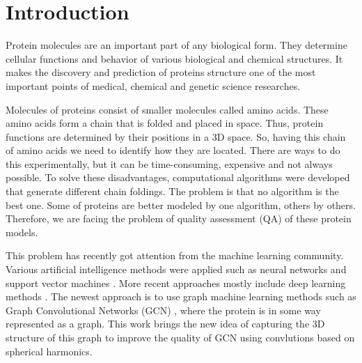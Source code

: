 \documentclass[12pt,twoside]{article}
\title
{Quality prediction of proteins models with spherical convolutions on three-dimensional graphs}
\author
{Nikita Pavlichenko, Sergei Grudinin, Ilia Igashov.} %
\begin{document}
	
	\maketitle
	
	\section{Introduction}
	Protein molecules are an important part of any biological form. They determine cellular 
	functions and behavior of various biological and chemical structures. It makes the discovery 
	and prediction of proteins structure one of the most important points of medical, chemical 
	and genetic science researches.

	Molecules of proteins consist of smaller molecules called amino acids. These amino acids
	form a chain that is folded and placed in space. Thus, protein functions are determined
	by their positions in a 3D space. So, having this chain of amino acids we need to identify
	how they are located. There are ways to do this experimentally, but it can be time-consuming,
	expensive and not always possible. To solve these disadvantages, computational algorithms \cite{Arnold2005}\cite{Lundstroem2008}\cite{Xu2019}
	were developed that generate different chain foldings. The problem is that no algorithm is the 
	best one. Some of proteins are better modeled by one algorithm, others by others. Therefore, we 
	are facing the problem of quality assessment (QA) of these protein models.

	This problem has recently got attention from the machine learning community. Various artificial
	intelligence methods were applied such as neural networks \cite{Wallner2003} and support vector machines \cite{Ray2012}\cite{Uziela2016}.
	More recent approaches mostly include deep learning methods \cite{Hurtado2018}\cite{Derevyanko2018}\cite{Pages2019}\cite{Conover2019}. The newest approach is to use graph
	machine learning methods such as Graph Convolutional Networks (GCN) \cite{Baldassarre2020GRAPHQAPM}, where the protein is in some
	way represented as a graph. This work brings the new idea of capturing the 3D structure of this graph 
	to improve the quality of GCN using convlutions based on spherical harmonics.
\end{document}
